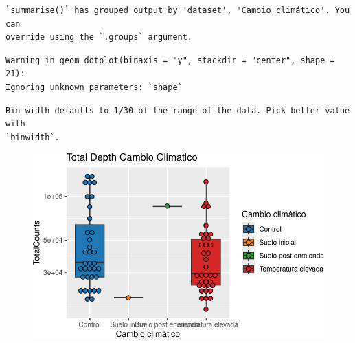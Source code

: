 \documentclass[
  letterpaper,
  DIV=11,
  numbers=noendperiod]{scrartcl}
\begin{document}
\begin{verbatim}
`summarise()` has grouped output by 'dataset', 'Cambio climático'. You can
override using the `.groups` argument.
\end{verbatim}

\begin{verbatim}
Warning in geom_dotplot(binaxis = "y", stackdir = "center", shape = 21):
Ignoring unknown parameters: `shape`
\end{verbatim}

\begin{verbatim}
Bin width defaults to 1/30 of the range of the data. Pick better value with
`binwidth`.
\end{verbatim}

\begin{figure}[H]

{\centering \includegraphics{InformeNeiker_files/figure-pdf/unnamed-chunk-5-3.pdf}

}

\end{figure}
\end{document}
